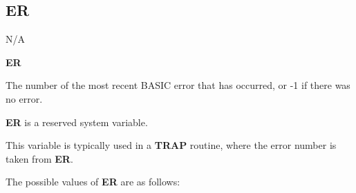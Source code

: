 \subsection{ER}
\begin{description}[leftmargin=2cm,style=nextline]
\item [Token:]    N/A

\item [Format:]   {\bf ER}

\item [Usage:]    The number of the most recent BASIC error that has occurred, or -1 if there was no error.

\item [Remarks:]  {\bf ER} is a reserved system variable.

                  This variable is typically used in a {\bf TRAP} routine, where the error number is taken from {\bf ER}.

                  The possible values of {\bf ER} are as follows:


\end{description}
